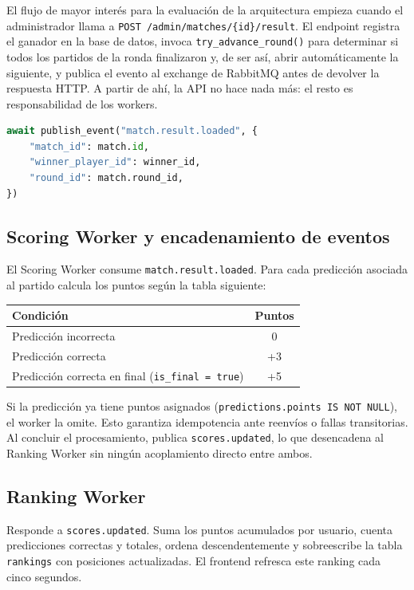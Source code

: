 \documentclass[12pt, a4paper]{article}
\begin{document}
El flujo de mayor interés para la evaluación de la arquitectura empieza cuando el administrador llama a \texttt{POST /admin/matches/\{id\}/result}. El endpoint registra el ganador en la base de datos, invoca \texttt{try\_advance\_round()} para determinar si todos los partidos de la ronda finalizaron y, de ser así, abrir automáticamente la siguiente, y publica el evento al exchange de RabbitMQ antes de devolver la respuesta HTTP. A partir de ahí, la API no hace nada más: el resto es responsabilidad de los workers.

\begin{lstlisting}[language=Python, caption={Publicación del evento tras cargar un resultado (admin.py).}]
await publish_event("match.result.loaded", {
    "match_id": match.id,
    "winner_player_id": winner_id,
    "round_id": match.round_id,
})
\end{lstlisting}

\subsection{Scoring Worker y encadenamiento de eventos}

El Scoring Worker consume \texttt{match.result.loaded}. Para cada predicción asociada al partido calcula los puntos según la tabla siguiente:

\begin{center}
\begin{tabular}{lc}
\toprule
Condición & Puntos \\
\midrule
Predicción incorrecta & 0 \\
Predicción correcta & +3 \\
Predicción correcta en final (\texttt{is\_final = true}) & +5 \\
\bottomrule
\end{tabular}
\end{center}

Si la predicción ya tiene puntos asignados (\texttt{predictions.points IS NOT NULL}), el worker la omite. Esto garantiza idempotencia ante reenvíos o fallas transitorias. Al concluir el procesamiento, publica \texttt{scores.updated}, lo que desencadena al Ranking Worker sin ningún acoplamiento directo entre ambos.

\subsection{Ranking Worker}

Responde a \texttt{scores.updated}. Suma los puntos acumulados por usuario, cuenta predicciones correctas y totales, ordena descendentemente y sobreescribe la tabla \texttt{rankings} con posiciones actualizadas. El frontend refresca este ranking cada cinco segundos.
\end{document}
